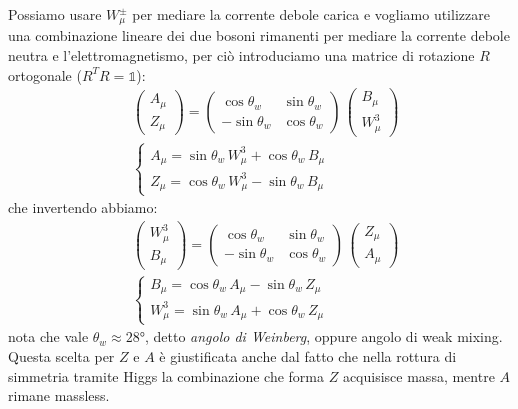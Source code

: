 Possiamo usare $W_\mu^\pm$ per mediare la corrente debole carica e vogliamo utilizzare una combinazione lineare dei due bosoni rimanenti per mediare la corrente debole neutra e l'elettromagnetismo, per ciò introduciamo una matrice di rotazione $R$ ortogonale ($R^T R = \mathbb{1}$):
\begin{align}
    &\begin{pmatrix}
        A_\mu \\
        Z_\mu
    \end{pmatrix} = \begin{pmatrix}
        \cos\theta_w & \sin\theta_w \\
        -\sin\theta_w & \cos\theta_w
    \end{pmatrix}\, \begin{pmatrix}
        B_\mu \\
        W_\mu^3
    \end{pmatrix} \\
    &\begin{cases}
        A_\mu = \sin\theta_w\, W_\mu^3 + \cos\theta_w\, B_\mu \\
        Z_\mu = \cos\theta_w\, W_\mu^3 - \sin\theta_w\, B_\mu
    \end{cases}
\end{align}
che invertendo abbiamo:
\begin{align}
    &\begin{pmatrix}
        W_\mu^3 \\
        B_\mu
    \end{pmatrix} = \begin{pmatrix}
        \cos\theta_w & \sin\theta_w \\
        -\sin\theta_w & \cos\theta_w
    \end{pmatrix}\, \begin{pmatrix}
        Z_\mu \\
        A_\mu
    \end{pmatrix} \\
    &\begin{cases}
        B_\mu = \cos\theta_w\, A_\mu - \sin\theta_w\, Z_\mu \\
        W_\mu^3 = \sin\theta_w\, A_\mu + \cos\theta_w\, Z_\mu
    \end{cases}
\end{align}
nota che vale $\theta_w\approx 28\unit{\degree}$, detto \textit{angolo di Weinberg}, oppure angolo di weak mixing. Questa scelta per $Z$ e $A$ è giustificata anche dal fatto che nella rottura di simmetria tramite Higgs la combinazione che forma $Z$ acquisisce massa, mentre $A$ rimane massless.

